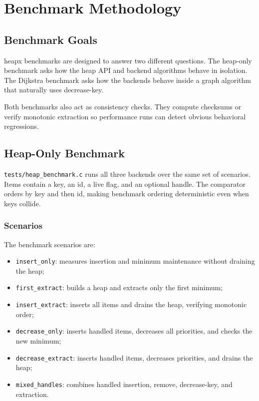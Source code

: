 \chapter{Benchmark Methodology}

\section{Benchmark Goals}

heapx benchmarks are designed to answer two different questions.
The heap-only benchmark asks how the heap API and backend algorithms behave in isolation.
The Dijkstra benchmark asks how the backends behave inside a graph algorithm that naturally uses decrease-key.

Both benchmarks also act as consistency checks.
They compute checksums or verify monotonic extraction so performance runs can detect obvious behavioral regressions.

\section{Heap-Only Benchmark}

\texttt{tests/heap\_benchmark.c} runs all three backends over the same set of scenarios.
Items contain a key, an id, a live flag, and an optional handle.
The comparator orders by key and then id, making benchmark ordering deterministic even when keys collide.

\subsection{Scenarios}

The benchmark scenarios are:

\begin{itemize}
    \item \texttt{insert\_only}: measures insertion and minimum maintenance without draining the heap;
    \item \texttt{first\_extract}: builds a heap and extracts only the first minimum;
    \item \texttt{insert\_extract}: inserts all items and drains the heap, verifying monotonic order;
    \item \texttt{decrease\_only}: inserts handled items, decreases all priorities, and checks the new minimum;
    \item \texttt{decrease\_extract}: inserts handled items, decreases priorities, and drains the heap;
    \item \texttt{mixed\_handles}: combines handled insertion, remove, decrease-key, and extraction.
\end{itemize}

